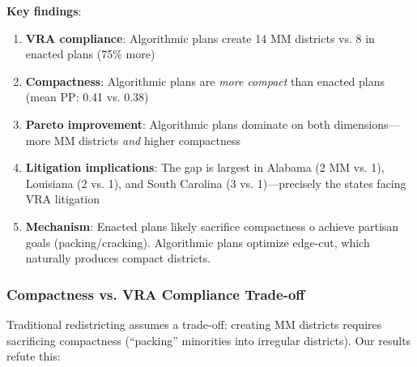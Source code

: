 \textbf{Key findings}:
\begin{enumerate}
    \item \textbf{VRA compliance}: Algorithmic plans create 14 MM districts vs. 8 in enacted plans (75\% more)

    \item \textbf{Compactness}: Algorithmic plans are \textit{more compact} than enacted plans (mean PP: 0.41 vs. 0.38)

    \item \textbf{Pareto improvement}: Algorithmic plans dominate on both dimensions---more MM districts \textit{and} higher compactness

    \item \textbf{Litigation implications}: The gap is largest in Alabama (2 MM vs. 1), Louisiana (2 vs. 1), and South Carolina (3 vs. 1)---precisely the states facing VRA litigation~\cite{singleton2023,robinson2023,naacp2023}

    \item \textbf{Mechanism}: Enacted plans likely sacrifice compactness 	o achieve partisan goals (packing/cracking). Algorithmic plans optimize edge-cut, which naturally produces compact districts.
\end{enumerate}

\subsubsection{Compactness vs. VRA Compliance Trade-off}

Traditional redistricting assumes a trade-off: creating MM districts requires sacrificing compactness (``packing'' minorities into irregular districts). Our results refute this:


